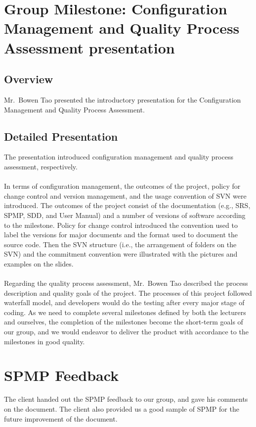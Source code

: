 \documentclass[12pt, a4paper]{article}
\begin{document}
\section{Group Milestone:  Configuration Management and Quality Process Assessment presentation}

\subsection{Overview}

Mr.~Bowen Tao presented the introductory presentation for the Configuration Management and Quality Process Assessment.

\subsection{Detailed Presentation}
The presentation introduced configuration management and quality process assessment, respectively.\\
\\
In terms of configuration management, the outcomes of the project, policy for change control and version management, and the
usage convention of SVN were introduced. The outcomes of the project consist of the documentation (e.g., SRS, SPMP, SDD, and
User Manual) and a number of versions of software according to the milestone. Policy for change control introduced the
convention used to label the versions for major documents and the format used to document the source code. Then the SVN
structure (i.e., the arrangement of folders on the SVN) and the commitment convention were illustrated with the pictures and
examples on the slides.\\
\\
Regarding the quality process assessment, Mr.~Bowen Tao described the process description and quality goals of the project. The processes of this project followed waterfall model, and developers would do the testing after every major stage of coding. As we need to complete several milestones defined by both the lecturers and ourselves, the completion of the milestones become the short-term goals of our group, and we would endeavor to deliver the product with accordance to the milestones in good quality.\\


\section{SPMP Feedback}
The client handed out the SPMP feedback to our group, and gave his comments on the document. The client also provided us a good sample of SPMP for the future improvement of the document.
\end{document}
